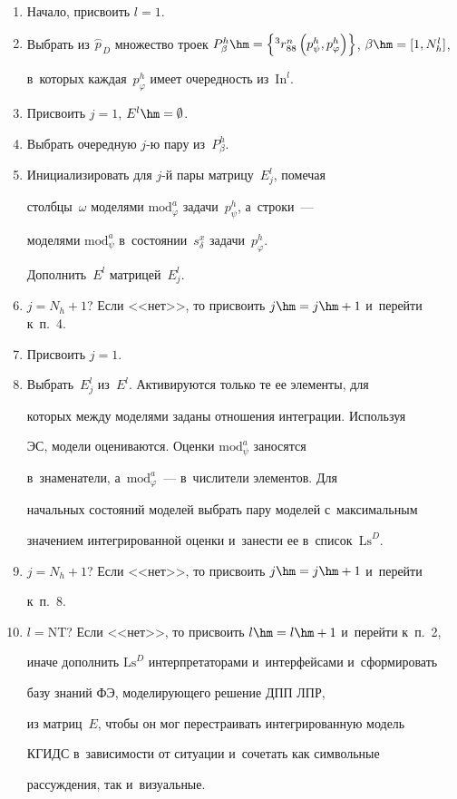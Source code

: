   \begin{enumerate}[1.]

\item Начало, присвоить $l = 1$.

\item Выбрать из $\overset{\frown}{p}_D$ множество троек $P^h_{\beta}\hm= \left\{ {}^3 

r^n_{88}\left( p^h_\psi, p^h_\varphi \right)\right\}$, $\beta\hm= [1, N_h^l]$, 

в~которых каждая~$p^h_{\varphi}$ имеет очередность из~$\mathrm{In}^l$.

\item Присвоить $j=1$, $E^l\hm=\emptyset$.

\item Выбрать очередную $j$-ю пару из~$P^h_\beta$.

\item Инициализировать для $j$-й пары матрицу~$E_j^l$, помечая 

столбцы~$\omega$ моделями $\mathrm{mod}_\varphi^a$ задачи~$p^h_\psi$, а~строки~--- 

моделями $\mathrm{mod}^a_\psi$ в~со\-сто\-янии~$s^x_\delta$ задачи~$p^h_{\varphi}$. 

Дополнить~$E^l$ матрицей~$E^l_j$.

\item $j=N_h+1$? Если <<нет>>, то присвоить $j\hm= j\hm+1$ и~перейти к~п.~4.

\item Присвоить $j=1$.

\item Выбрать~$E_j^l$ из~$E^l$. Активируются только те ее элементы, для 

которых между моделями заданы отношения интеграции. Используя 

ЭС, модели оцениваются. Оценки $\mathrm{mod}^a_\psi$ заносятся 

в~знаменатели, а~$\mathrm{mod}^a_{\varphi}$~--- в~числители элементов. Для 

начальных состояний моделей выбрать пару моделей с~максимальным 

значением интегрированной оценки и~занести ее в~список~$\mathrm{Ls}^D$.

\item $j=N_h+1$? Если <<нет>>, то присвоить $j\hm= j\hm+1$ и~перейти 

к~п.~8.

\item $l=\mathrm{NT}$? Если <<нет>>, то присвоить $l\hm=l\hm+1$ и~перейти к~п.~2, 

иначе дополнить $\mathrm{Ls}^D$ интерпретаторами и~интерфейсами и~сформировать 

базу знаний ФЭ, моделирующего решение ДПП ЛПР, 

из матриц~$E$, чтобы он мог перестраивать интегрированную модель 

\mbox{КГИДС} в~за\-ви\-си\-мости от ситуации и~сочетать как символьные 

рассуждения, так и~визуальные.

\end{enumerate}

